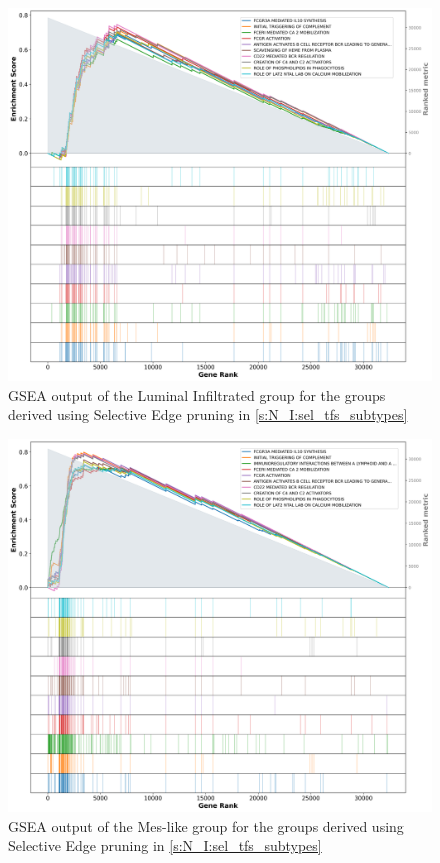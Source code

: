 \begin{figure}[!htb]
    \centering
    \includegraphics[width=\textwidth,keepaspectratio]{Sections/Network_I/Resources/selective_pruning/gsea/lumInf_10_top_manTerms.png}
    \caption{GSEA output of the Luminal Infiltrated group for the groups derived using Selective Edge pruning in  \cref{s:N_I:sel_tfs_subtypes}}
    \label{fig:ap:gsea_lumInf}
\end{figure}

\begin{figure}[!htb]
    \centering
    \includegraphics[width=\textwidth,keepaspectratio]{Sections/Network_I/Resources/selective_pruning/gsea/mesLike_10_top_manTerms.png}
    \caption{GSEA output of the Mes-like group for the groups derived using Selective Edge pruning in  \cref{s:N_I:sel_tfs_subtypes}}
    \label{fig:ap:gsea_mesLike}
\end{figure}

